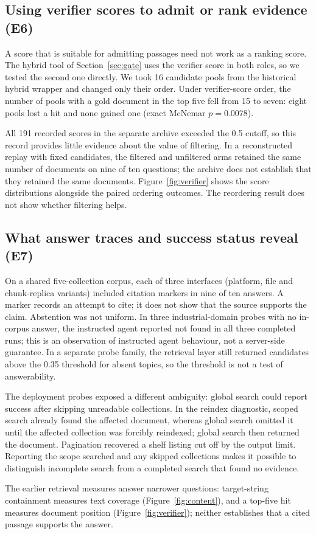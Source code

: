 \subsection{Using verifier scores to admit or rank evidence (E6)}
\label{sec:e6}
\label{sec:inflation}\label{sec:eval-verify}\label{sec:exp-e6}
A score that is suitable for admitting passages need not work as a ranking
score. The hybrid tool of Section~\ref{sec:gate} uses the verifier score in
both roles, so we tested the second one directly. We took 16 candidate pools
from the historical hybrid wrapper and changed only their order. Under
verifier-score order, the number of pools with a gold document in the top
five fell from 15 to seven: eight pools lost a hit and none gained one
(exact McNemar $p=0.0078$).

All 191 recorded scores in the separate archive exceeded the 0.5 cutoff,
so this record provides little evidence about the value of filtering. In a
reconstructed replay with fixed candidates, the filtered and unfiltered arms
retained the same number of documents on nine of ten questions; the archive
does not establish that they retained the same documents. Figure~\ref{fig:verifier}
shows the score distributions alongside the paired ordering outcomes. The
reordering result does not show whether filtering helps.

\subsection{What answer traces and success status reveal (E7)}
\label{sec:e5}
\label{sec:agentic}\label{sec:abstention}\label{sec:composition}\label{sec:eval-agent}
\label{sec:sysarms}\label{sec:e7}\label{sec:exp-e7}
On a shared five-collection corpus, each of three interfaces (platform, file
and chunk-replica variants) included citation markers in nine of ten answers. A marker records an attempt to
cite; it does not show that the source supports the claim. Abstention was
not uniform. In three industrial-domain probes with no in-corpus answer, the
instructed agent reported not found in all three completed runs; this is an
observation of instructed agent behaviour, not a server-side guarantee. In a
separate probe family, the retrieval layer still returned candidates above
the 0.35 threshold for absent topics, so the threshold is not a test of
answerability.

The deployment probes exposed a different ambiguity: global search could
report success after skipping unreadable collections. In the reindex
diagnostic, scoped search already found the affected document, whereas
global search omitted it until the affected collection was forcibly
reindexed; global search then returned the document. Pagination recovered a
shelf listing cut off by the output limit. Reporting the scope searched and
any skipped collections makes it possible to distinguish incomplete search
from a completed search that found no evidence.

The earlier retrieval measures answer narrower questions: target-string containment measures text coverage
(Figure~\ref{fig:content}), and a top-five hit measures document position
(Figure~\ref{fig:verifier}); neither establishes that a cited passage
supports the answer.
